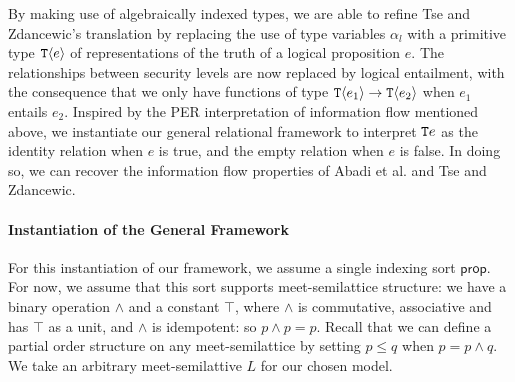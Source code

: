 By making use of algebraically indexed types, we are able to refine
Tse and Zdancewic's translation by replacing the use of type variables
$\alpha_l$ with a primitive type $\textup{\texttt{T}}\langle e \rangle$ of representations of
the truth of a logical proposition $e$. The relationships between
security levels are now replaced by logical entailment, with the
consequence that we only have functions of type $\textup{\texttt{T}}\langle e_1 \rangle \to
\textup{\texttt{T}}\langle e_2 \rangle$ when $e_1$ entails $e_2$. Inspired by the PER
interpretation of information flow mentioned above, we instantiate our
general relational framework to interpret $\textup{\texttt{T}}{e}$ as the
identity relation when $e$ is true, and the empty relation when $e$ is
false. In doing so, we can recover the information flow properties of
Abadi et al. and Tse and Zdancewic.

\paragraph{Instantiation of the General Framework}
For this instantiation of our framework, we assume a single indexing
sort $\mathsf{prop}$. For now, we assume that this sort supports
meet-semilattice structure: we have a binary operation $\land$ and a
constant $\top$, where $\land$ is commutative, associative and has
$\top$ as a unit, and $\land$ is idempotent: so $p \land p =
p$. Recall that we can define a partial order structure on any
meet-semilattice by setting $p \leq q$ when $p = p \land q$. We take
an arbitrary meet-semilattive $L$ for our chosen model.


